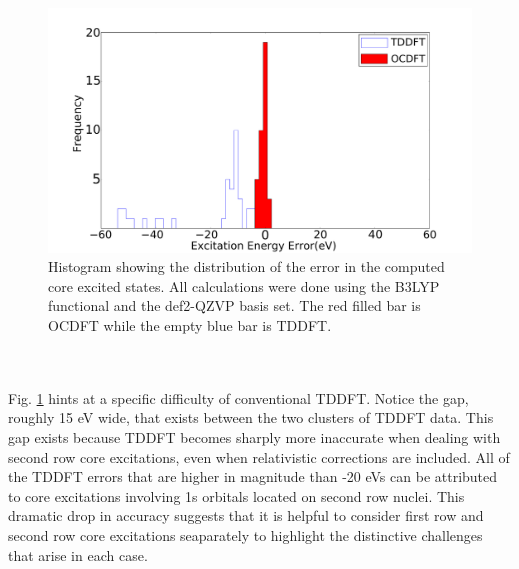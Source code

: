 \documentclass[12pt]{article}
\begin{document}
\begin{figure}[!ht]
\includegraphics[scale=0.17]{TDDFT_OCDFT_histogram.pdf}
\caption{Histogram showing the distribution of the error in the computed core excited states. All calculations were done using the B3LYP functional and the def2-QZVP basis set. The red filled bar is OCDFT while the empty blue bar is TDDFT.}
\label{figure:Hist}
\end{figure}
\\ \\
Fig. \ref{figure:Hist} hints at a specific difficulty of conventional TDDFT. Notice the gap, roughly 15 eV wide, that exists between the two clusters of TDDFT data. This gap exists because TDDFT becomes sharply more inaccurate when dealing with second row core excitations, even when relativistic corrections are included. All of the TDDFT errors that are higher in magnitude than -20 eVs can be attributed to core excitations involving 1s orbitals located on second row nuclei. This dramatic drop in accuracy suggests that it is helpful to consider first row and second row core excitations seaparately to highlight the distinctive challenges that arise in each case.
\end{document}
